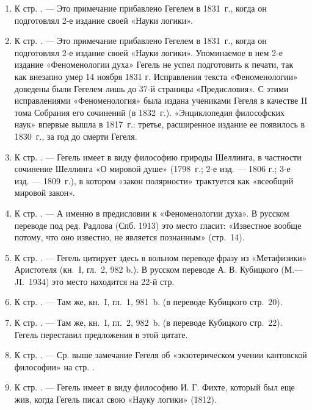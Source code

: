 \begin{enumerate}
\item \label{bkm:Ref474654409}К стр. \pageref{bkm:bm01}. — Это примечание
прибавлено Гегелем в 1831~г., когда он подготовлял 2-е издание своей «Науки
логики».
\item \label{bkm:Ref474656094}К стр. \pageref{bkm:bm02}. — Это примечание
прибавлено Гегелем в 1831~г., когда он подготовлял 2-е издание своей «Науки
логики». Упоминаемое в нем 2-е издание «Феноменологии духа» Гегель не успел
подготовить к печати, так как внезапно умер 14 ноября 1831 г. Исправления
текста «Феноменологии» доведены были Гегелем лишь до 37-й страницы
«Предисловия». С этими исправлениями «Феноменология» была издана учениками
Гегеля в качестве II тома Собрания его сочинений (в 1832~г.). «Энциклопедия
философских наук» впервые вышла в 1817~г.: третье, расширенное издание ее
появилось в 1830~г., за год до смерти Гегеля.
\item \label{bkm:Ref474656170}К стр. \pageref{bkm:bm03}. — Гегель имеет в
виду философию природы Шеллинга, в частности сочинение Шеллинга «О мировой
душе» (1798~г.; 2-е изд. — 1806 г.; 3-е изд. — 1809~г.), в котором «закон
полярности» трактуется как «всеобщий мировой закон».
\item \label{bkm:Ref474656176}К стр. \pageref{bkm:bm04}. — А именно в
предисловии к «Феноменологии духа». В русском переводе под ред. Радлова
(Спб. 1913) это место гласит: «Известное вообще потому, что оно известно,
не является познанным» (стр.~14).
\item \label{bkm:Ref474656188}К стр. \pageref{bkm:bm05}. — Гегель цитирует
здесь в вольном переводе фразу из «Метафизики» Аристотеля (кн.~I, гл.~2,
982 b.). В русском переводе А. В. Кубицкого (М.—JI.~1934) это место
находится на 22-й стр.
\item \label{bkm:Ref474656193}К стр. \pageref{bkm:bm06}. — Там же, кн.~I,
гл.~1, 981~b. (в переводе Кубицкого стр.~20).
\item \label{bkm:Ref474656208}К стр. \pageref{bkm:bm07}. — Там же, кн.~I,
гл.~2, 982~b. (в переводе Кубицкого стр.~22). Гегель переставил предложения
в этой цитате.
\item \label{bkm:Ref474656355}К стр. \pageref{bkm:bm08}. — Ср. выше
замечание Гегеля об «экзотерическом учении кантовской философии» на стр.
\pageref{bkm:Ref474526580}.
\item \label{bkm:Ref474656376}К стр. \pageref{bkm:bm09}. — Гегель имеет в
виду философию И. Г. Фихте, который был еще жив, когда Гегель писал свою
«Науку логики» (1812).

\end{enumerate}
